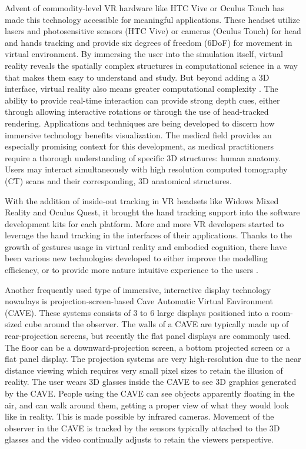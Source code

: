 Advent of commodity-level VR hardware like HTC Vive or Oculus Touch has made this technology accessible for meaningful applications. These headset utilize lasers and photosensitive sensors (HTC Vive) or cameras (Oculus Touch) for head and hands tracking and provide six degrees of freedom (6DoF) for movement in virtual environment. By immersing the user into the simulation itself, virtual reality reveals the spatially complex structures in computational science in a way that makes them easy to understand and study. But beyond adding a 3D interface, virtual reality also means greater computational complexity \citep{brysonVirtualRealityScientific}. The ability to provide real-time interaction can provide strong depth cues, either through allowing interactive rotations or through the use of head-tracked rendering. Applications and techniques are being developed to discern how immersive technology benefits visualization. The medical field provides an especially promising context for this development, as medical practitioners require a thorough understanding of specific 3D structures: human anatomy. Users may interact simultaneously with high resolution computed tomography (CT) scans and their corresponding, 3D anatomical structures.

With the addition of inside-out tracking in VR headsets like Widows Mixed Reality and Oculus Quest, it brought the hand tracking support into the software development kits for each platform. More and more VR developers started to leverage the hand tracking in the interfaces of their applications. Thanks to the growth of gestures usage in virtual reality and embodied cognition, there have been various new technologies developed to either improve the modelling efficiency, or to provide more nature intuitive experience to the users \citep{dangetiComparingBarehandinairGesture2016}.

Another frequently used type of immersive, interactive display technology nowadays is projection-screen-based Cave Automatic Virtual Environment (CAVE). These systems consists of 3 to 6 large displays positioned into a room-sized cube around the observer. The walls of a CAVE are typically made up of rear-projection screens, but recently the flat panel displays are commonly used. The floor can be a downward-projection screen, a bottom projected screen or a flat panel display. The projection systems are very high-resolution due to the near distance viewing which requires very small pixel sizes to retain the illusion of reality. The user wears 3D glasses inside the CAVE to see 3D graphics generated by the CAVE. People using the CAVE can see objects apparently floating in the air, and can walk around them, getting a proper view of what they would look like in reality. This is made possible by infrared cameras. Movement of the observer in the CAVE is tracked by the sensors typically attached to the 3D glasses and the video continually adjusts to retain the viewers perspective.

